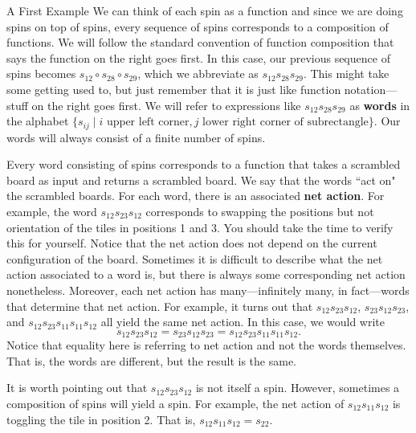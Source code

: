 \begin{section}{A First Example}
We can think of each spin as a function and since we are doing spins on top of spins, every sequence of spins corresponds to a composition of functions. We will follow the standard convention of function composition that says the function on the right goes first.  In this case, our previous sequence of spins becomes $s_{12} \circ s_{28}  \circ s_{29}$, which we abbreviate as $s_{12} s_{28} s_{29}$. This might take some getting used to, but just remember that it is just like function notation---stuff on the right goes first. We will refer to expressions like $s_{12} s_{28} s_{29}$ as \textbf{words} in the alphabet $\{s_{ij}\mid i\text{ upper left corner}, j\text{ lower right corner of subrectangle}\}$.  Our words will always consist of a finite number of spins.

Every word consisting of spins corresponds to a function that takes a scrambled board as input and returns a scrambled board. We say that the words ``act on" the scrambled boards. For each word, there is an associated \textbf{net action}. For example, the word $s_{12} s_{23} s_{12}$ corresponds to swapping the positions but not orientation of the tiles in positions 1 and 3.  You should take the time to verify this for yourself. Notice that the net action does not depend on the current configuration of the board. Sometimes it is difficult to describe what the net action associated to a word is, but there is always some corresponding net action nonetheless. Moreover, each net action has many---infinitely many, in fact---words that determine that net action. For example, it turns out that $s_{12}s_{23}s_{12}$, $s_{23}s_{12}s_{23}$, and $s_{12}s_{23}s_{11}s_{11}s_{12}$ all yield the same net action.   In this case, we would write
\[
s_{12}s_{23}s_{12}=s_{23}s_{12}s_{23}=s_{12}s_{23}s_{11}s_{11}s_{12}.
\]
Notice that equality here is referring to net action and not the words themselves.  That is, the words are different, but the result is the same.

It is worth pointing out that $s_{12} s_{23} s_{12}$ is not itself a spin.  However, sometimes a composition of spins will yield a spin.  For example, the net action of $s_{12} s_{11} s_{12}$ is toggling the tile in position 2.  That is, $s_{12} s_{11} s_{12}=s_{22}$.


\end{section}
